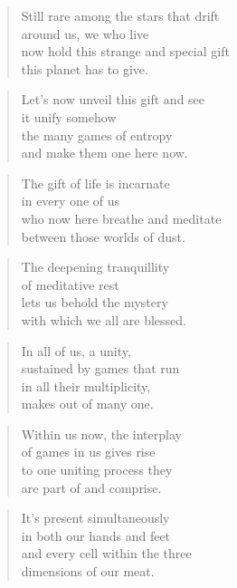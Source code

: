\documentclass[10pt,a4paper]{article}
\begin{document}
\begin{paracol}{2}


\begin{verse}
Still rare among the stars that drift\\
around us, we who live\\
now hold this strange and special gift\\
this planet has to give.
\end{verse}

\begin{verse}
Let’s now unveil this gift and see\\
it unify somehow\\
the many games of entropy\\
and make them one here now.
\end{verse}

\begin{verse}
The gift of life is incarnate\\
in every one of us\\
who now here breathe and meditate\\
between those worlds of dust.
\end{verse}

\begin{verse}
The deepening tranquillity\\
of meditative rest\\
lets us behold the mystery\\
with which we all are blessed.
\end{verse}

\begin{verse}
In all of us, a unity,\\
sustained by games that run\\
in all their multiplicity,\\
makes out of many one.
\end{verse}

\begin{verse}
Within us now, the interplay\\
of games in us gives rise\\
to one uniting process they\\
are part of and comprise.
\end{verse}

\begin{verse}
It’s present simultaneously\\
in both our hands and feet\\
and every cell within the three\\
dimensions of our meat.
\end{verse}


\end{paracol}
\end{document}
